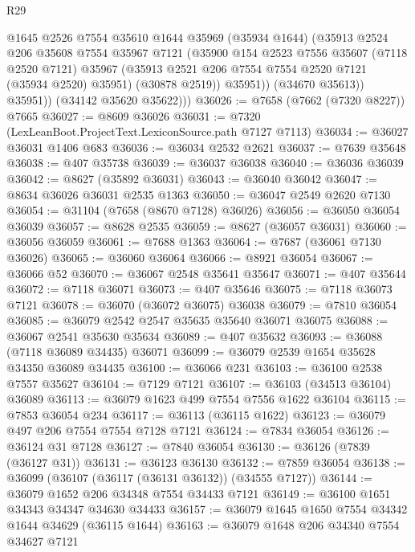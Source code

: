 \begin{lexlean}{R29}
\begin{coremodule}
                @1645
                @2526
                @7554
                @35610
                @1644
                @35969
                (@35934 @1644)
                (@35913
                  @2524
                  @206
                  @35608
                  @7554
                  @35967
                  @7121
                  (@35900
                    @154
                    @2523
                    @7556
                    @35607
                    (@7118 @2520 @7121)
                    @35967
                    (@35913 @2521 @206 @7554 @7554 @2520 @7121 (@35934 @2520) @35951)
                    (@30878 @2519))
                  @35951))
              (@34670 @35613))
            @35951))
        (@34142 @35620 @35622)))
@36026 := @7658 (@7662 (@7320 @8227)) @7665
@36027 := @8609 @36026
@36031 := @7320 (LexLeanBoot.ProjectText.LexiconSource.path @7127 @7113)
@36034 := @36027 @36031 @1406 @683
@36036 := @36034 @2532 @2621
@36037 := @7639 @35648
@36038 := @407 @35738
@36039 := @36037 @36038
@36040 := @36036 @36039
@36042 := @8627 (@35892 @36031)
@36043 := @36040 @36042
@36047 := @8634 @36026 @36031 @2535 @1363
@36050 := @36047 @2549 @2620 @7130
@36054 := @31104 (@7658 (@8670 @7128) @36026)
@36056 := @36050 @36054 @36039
@36057 := @8628 @2535
@36059 := @8627 (@36057 @36031)
@36060 := @36056 @36059
@36061 := @7688 @1363
@36064 := @7687 (@36061 @7130 @36026)
@36065 := @36060 @36064
@36066 := @8921 @36054
@36067 := @36066 @52
@36070 := @36067 @2548 @35641 @35647
@36071 := @407 @35644
@36072 := @7118 @36071
@36073 := @407 @35646
@36075 := @7118 @36073 @7121
@36078 := @36070 (@36072 @36075) @36038
@36079 := @7810 @36054
@36085 := @36079 @2542 @2547 @35635 @35640 @36071 @36075
@36088 := @36067 @2541 @35630 @35634
@36089 := @407 @35632
@36093 := @36088 (@7118 @36089 @34435) @36071
@36099 := @36079 @2539 @1654 @35628 @34350 @36089 @34435
@36100 := @36066 @231
@36103 := @36100 @2538 @7557 @35627
@36104 := @7129 @7121
@36107 := @36103 (@34513 @36104) @36089
@36113 := @36079 @1623 @499 @7554 @7556 @1622 @36104
@36115 := @7853 @36054 @234
@36117 := @36113 (@36115 @1622)
@36123 := @36079 @497 @206 @7554 @7554 @7128 @7121
@36124 := @7834 @36054
@36126 := @36124 @31 @7128
@36127 := @7840 @36054
@36130 := @36126 (@7839 (@36127 @31))
@36131 := @36123 @36130
@36132 := @7859 @36054
@36138 := @36099 (@36107 (@36117 (@36131 @36132)) (@34555 @7127))
@36144 := @36079 @1652 @206 @34348 @7554 @34433 @7121
@36149 := @36100 @1651 @34343 @34347 @34630 @34433
@36157 := @36079 @1645 @1650 @7554 @34342 @1644 @34629 (@36115 @1644)
@36163 := @36079 @1648 @206 @34340 @7554 @34627 @7121

\end{coremodule}
\end{lexlean}
